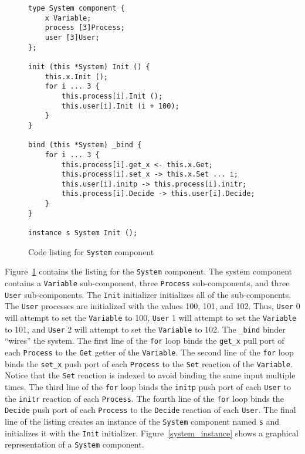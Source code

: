 \begin{figure}
\begin{verbatim}
type System component {
    x Variable;
    process [3]Process;
    user [3]User;
};

init (this *System) Init () {
    this.x.Init ();
    for i ... 3 {
        this.process[i].Init ();
        this.user[i].Init (i + 100);
    }
}

bind (this *System) _bind {
    for i ... 3 {
        this.process[i].get_x <- this.x.Get;
        this.process[i].set_x -> this.x.Set ... i;
        this.user[i].initp -> this.process[i].initr;
        this.process[i].Decide -> this.user[i].Decide;
    }
}

instance s System Init ();
\end{verbatim}
\cprotect\caption{Code listing for \verb+System+ component \label{system}}
\end{figure}

Figure~\ref{system} contains the listing for the \verb+System+ component.
The system component contains a \verb+Variable+ sub-component, three \verb+Process+ sub-components, and three \verb+User+ sub-components.
The \verb+Init+ initializer initializes all of the sub-components.
The \verb+User+ processes are initialized with the values 100, 101, and 102.
Thus, \verb+User+ 0 will attempt to set the \verb+Variable+ to 100, \verb+User+ 1 will attempt to set the \verb+Variable+ to 101, and \verb+User+ 2 will attempt to set the \verb+Variable+ to 102.
The \verb+_bind+ binder ``wires'' the system.
The first line of the \verb+for+ loop binds the \verb+get_x+ pull port of each \verb+Process+ to the \verb+Get+ getter of the \verb+Variable+.
The second line of the \verb+for+ loop binds the \verb+set_x+ push port of each \verb+Process+ to the \verb+Set+ reaction of the \verb+Variable+.
Notice that the \verb+Set+ reaction is indexed to avoid binding the same input multiple times.
The third line of the \verb+for+ loop binds the \verb+initp+ push port of each \verb+User+ to the \verb+initr+ reaction of each \verb+Process+.
The fourth line of the \verb+for+ loop binds the \verb+Decide+ push port of each \verb+Process+ to the \verb+Decide+ reaction of each \verb+User+.
The final line of the listing creates an instance of the \verb+System+ component named \verb+s+ and initializes it with the \verb+Init+ initializer.
Figure~\ref{system_instance} shows a graphical representation of a \verb+System+ component.

